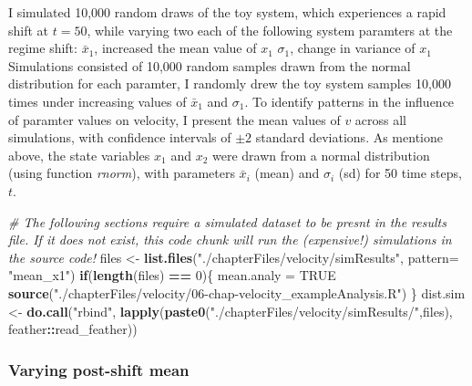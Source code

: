 \documentclass[12pt,twoside,openany]{reedthesis}
\newenvironment{Shaded}{\begin{snugshade}}{\end{snugshade}}
\newcommand{\CommentTok}[1]{\textcolor[rgb]{0.56,0.35,0.01}{\textit{#1}}}
\newcommand{\ControlFlowTok}[1]{\textcolor[rgb]{0.13,0.29,0.53}{\textbf{#1}}}
\newcommand{\DataTypeTok}[1]{\textcolor[rgb]{0.13,0.29,0.53}{#1}}
\newcommand{\DecValTok}[1]{\textcolor[rgb]{0.00,0.00,0.81}{#1}}
\newcommand{\KeywordTok}[1]{\textcolor[rgb]{0.13,0.29,0.53}{\textbf{#1}}}
\newcommand{\NormalTok}[1]{#1}
\newcommand{\OperatorTok}[1]{\textcolor[rgb]{0.81,0.36,0.00}{\textbf{#1}}}
\newcommand{\OtherTok}[1]{\textcolor[rgb]{0.56,0.35,0.01}{#1}}
\newcommand{\StringTok}[1]{\textcolor[rgb]{0.31,0.60,0.02}{#1}}
\begin{document}
I simulated 10,000 random draws of the toy system, which experiences a rapid shift at \(t = 50\), while varying two each of the following system paramters at the regime shift:
\(\bar{x}_1\), increased the mean value of \(x_1\)
\(\sigma_1\), change in variance of \(x_1\)
Simulations consisted of 10,000 random samples drawn from the normal distribution for each paramter, I randomly drew the toy system samples 10,000 times under increasing values of \(\bar{x}_1\) and \(\sigma_1\). To identify patterns in the influence of paramter values on velocity, I present the mean values of \(v\) across all simulations, with confidence intervals of \(\pm 2\) standard deviations. As mentione above, the state variables \(x_1\) and \(x_2\) were drawn from a normal distribution (using function \emph{rnorm}), with parameters \(\bar{x}_i\) (mean) and \(\sigma_i\) (sd) for 50 time steps, \(t\).
\begin{Shaded}
\begin{Highlighting}[]
\CommentTok{# The following sections require a simulated dataset to be presnt in the results file. If it does not exist, this code chunk will run the (expensive!) simulations in the source code!}
\NormalTok{files <-}\StringTok{ }\KeywordTok{list.files}\NormalTok{(}\StringTok{"./chapterFiles/velocity/simResults"}\NormalTok{, }\DataTypeTok{pattern=} \StringTok{"mean_x1"}\NormalTok{)}
\ControlFlowTok{if}\NormalTok{(}\KeywordTok{length}\NormalTok{(files) }\OperatorTok{==}\StringTok{ }\DecValTok{0}\NormalTok{)\{}
\NormalTok{  mean.analy =}\StringTok{ }\OtherTok{TRUE}
  \KeywordTok{source}\NormalTok{(}\StringTok{"./chapterFiles/velocity/06-chap-velocity_exampleAnalysis.R"}\NormalTok{)}
\NormalTok{\}}
\NormalTok{dist.sim <-}\StringTok{ }\KeywordTok{do.call}\NormalTok{(}\StringTok{"rbind"}\NormalTok{, }\KeywordTok{lapply}\NormalTok{(}\KeywordTok{paste0}\NormalTok{(}\StringTok{"./chapterFiles/velocity/simResults/"}\NormalTok{,files),}
\NormalTok{        feather}\OperatorTok{::}\NormalTok{read_feather))}
\end{Highlighting}
\end{Shaded}
\hypertarget{varying-post-shift-mean}{%
\subsubsection{Varying post-shift mean}\label{varying-post-shift-mean}}
\end{document}
